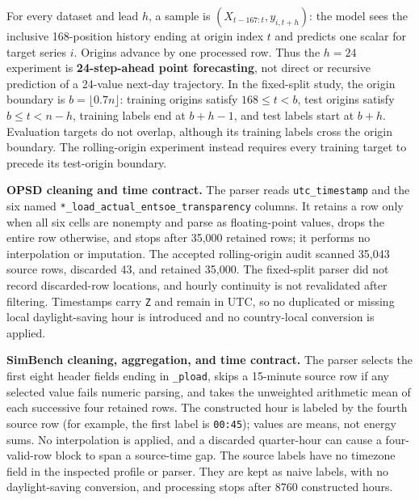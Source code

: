 \documentclass[electronics,article,submit,moreauthors]{Definitions/mdpi}
\begin{document}
For every dataset and lead \(h\), a sample is \((X_{t-167:t},y_{i,t+h})\): the model sees the inclusive 168-position history ending at origin index \(t\) and predicts one scalar for target series \(i\). Origins advance by one processed row. Thus the \(h=24\) experiment is \textbf{24-step-ahead point forecasting}, not direct or recursive prediction of a 24-value next-day trajectory. In the fixed-split study, the origin boundary is \(b=\lfloor0.7n\rfloor\): training origins satisfy \(168\leq t<b\), test origins satisfy \(b\leq t<n-h\), training labels end at \(b+h-1\), and test labels start at \(b+h\). Evaluation targets do not overlap, although its training labels cross the origin boundary. The rolling-origin experiment instead requires every training target to precede its test-origin boundary.

\textbf{OPSD cleaning and time contract.} The parser reads \texttt{utc\_timestamp} and the six named \texttt{*\_load\_actual\_entsoe\_transparency} columns. It retains a row only when all six cells are nonempty and parse as floating-point values, drops the entire row otherwise, and stops after 35,000 retained rows; it performs no interpolation or imputation. The accepted rolling-origin audit scanned 35,043 source rows, discarded 43, and retained 35,000. The fixed-split parser did not record discarded-row locations, and hourly continuity is not revalidated after filtering. Timestamps carry \texttt{Z} and remain in UTC, so no duplicated or missing local daylight-saving hour is introduced and no country-local conversion is applied.

\textbf{SimBench cleaning, aggregation, and time contract.} The parser selects the first eight header fields ending in \texttt{\_pload}, skips a 15-minute source row if any selected value fails numeric parsing, and takes the unweighted arithmetic mean of each successive four retained rows. The constructed hour is labeled by the fourth source row (for example, the first label is \texttt{00:45}); values are means, not energy sums. No interpolation is applied, and a discarded quarter-hour can cause a four-valid-row block to span a source-time gap. The source labels have no timezone field in the inspected profile or parser. They are kept as naive labels, with no daylight-saving conversion, and processing stops after 8760 constructed hours.
\end{document}
